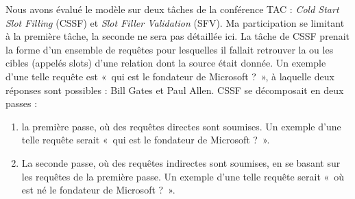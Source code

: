 \documentclass[PhD-Yoann-Dupont.tex]{subfiles}
\begin{document}
\begin{comment}
Voir \url{http://www.nist.gov/tac/2016/KBP/} pour description (tâche "cold start" en particulier). Participation finie...
\begin{itemize}
    \item reprendre livrables : Texte/livrables/L2.8 et Texte/livrables/L2.13 (année 3 -- 1 et 2 aussi ?)
        \begin{itemize}
            \item modèle prototypique avec pas grand chose
            \item adaptation de l'analyse en dépendances
        \end{itemize}
    \item projets
        \begin{itemize}
            \item intégrer analyse en dépendances $\implies$ adaptation d'un corpus annoté en dépendances à une autre schéma d'annotation. Intérêt : pouvoir créer des parseurs en dépendances véritablement adaptés, donc meilleure qualité.
            \item intégrer REN par machine learning, voir chaptire\ \ref{chap:structured-NER}.
        \end{itemize}
\end{itemize}
\end{comment}

Nous avons évalué le modèle sur deux tâches de la conférence TAC : \emph{Cold Start Slot Filling} (CSSF) et \emph{Slot Filler Validation} (SFV). Ma participation se limitant à la première tâche, la seconde ne sera pas détaillée ici. La tâche de CSSF prenait la forme d'un ensemble de requêtes pour lesquelles il fallait retrouver la ou les cibles (appelés slots) d'une relation dont la source était donnée. Un exemple d'une telle requête est «\ qui est le fondateur de Microsoft ?\ », à laquelle deux réponses sont possibles : Bill Gates et Paul Allen. CSSF se décomposait en deux passes :

\begin{enumerate}
    \item la première passe, où des requêtes directes sont soumises.  Un exemple d'une telle requête serait «\ qui est le fondateur de Microsoft ?\ ».
    \item La seconde passe, où des requêtes indirectes sont soumises, en se basant sur les requêtes de la première passe. Un exemple d'une telle requête serait «\ où est né le fondateur de Microsoft ?\ ».
\end{enumerate}
\end{document}
